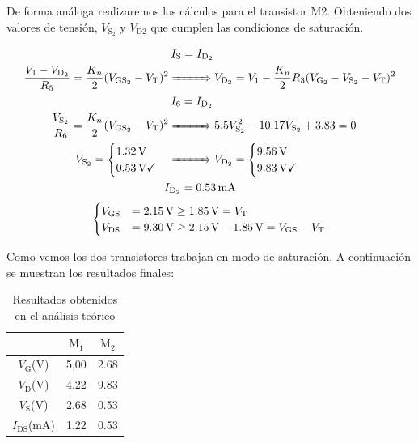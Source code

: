 \documentclass[11pt,a4paper]{article}
\begin{document}
		De forma análoga realizaremos los cálculos para el transistor M2. Obteniendo dos valores de tensión, $V_\mathrm{S_2}$ y $V_\mathrm{D2}$ que cumplen las condiciones de saturación.

		\begin{align*}
			&\hspace{2pt}I_{\mathrm{S}} = I_{\mathrm{D}_2} \\
			\frac{V_1 - V_{\mathrm{D}_2}}{R_5} = \frac{K_n}{2}(V_{\mathrm{GS}_2} - V_{\mathrm{T}})^2 &\xRightarrow{\hspace{27pt}} V_{\mathrm{D}_2} = V_1 - \frac{K_n}{2}R_3(V_{\mathrm{G}_2}-V_{\mathrm{S}_2}-V_{\mathrm{T}})^2 \\
			&\hspace{2pt}I_6 = I_{\mathrm{D}_2} \\
			\frac{V_{\mathrm{S}_2}}{R_6} = \frac{K_n}{2}(V_{\mathrm{GS}_2} - V_{\mathrm{T}})^2 &\xRightarrow{\hspace{27pt}} 5.5V_{\mathrm{S}_2}^2 - 10.17V_{\mathrm{S}_2} + 3.83 = 0 \\
			V_{\mathrm{S}_2} =
			\begin{cases}
				\SI{1.32}{\volt} \\
				\SI{0.53}{\volt} \checkmark
			\end{cases} &\xRightarrow{\hspace{27pt}}
			V_{\mathrm{D}_2} =
			\begin{cases}
				\SI{9.56}{\volt} \\
				\SI{9.83}{\volt} \checkmark
			\end{cases} \\
			&\hspace{-4pt}I_{\mathrm{D}_2} = \SI{0.53}{\milli\ampere}
		\end{align*}
		\begin{equation*}
			\begin{cases}
				V_\mathrm{GS} &= \SI{2.15}{\volt} \geq \SI{1.85}{\volt} =  V_\mathrm{T}\\
				V_\mathrm{DS} &= \SI{9.30}{\volt} \geq \SI{2.15}{\volt}-\SI{1.85}{\volt} = V_\mathrm{GS} - V_\mathrm{T}
			\end{cases} \\
		\end{equation*}

		Como vemos los dos transistores trabajan en modo de saturación. A continuación se muestran los resultados finales:

		\begin{table}[!hbt]
			\centering
			\caption{Resultados obtenidos en el análisis teórico}
			\begin{tabular}{c | c c}
				& $\mathrm{M}_1$ & $\mathrm{M}_2$ \\
				\hline\hline
				$V_\mathrm{G}$(V) & 5,00 & 2.68 \\
				$V_\mathrm{D}$(V) & 4.22 & 9.83 \\
				$V_\mathrm{S}$(V) & 2.68 & 0.53 \\
				$I_{\mathrm{DS}}$(mA) & 1.22 & 0.53
			\end{tabular}
			\label{tabla_resultadosanalisis}
		\end{table}
\end{document}
